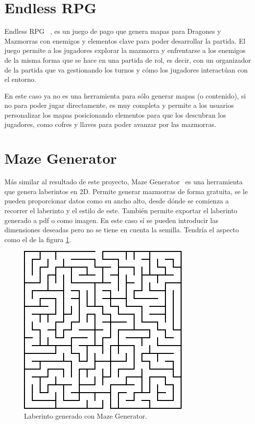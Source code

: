 \section{Endless RPG}

Endless RPG ~\cite{Endlessrpg}, es un juego de pago que genera mapas para Dragones y Mazmorras con enemigos y elementos clave para poder desarrollar la partida. El juego permite a los jugadores explorar la mazmorra y enfrentarse a los enemigos de la misma forma que se hace en una partida de rol, es decir, con un organizador de la partida que va gestionando los turnos y cómo los jugadores interactúan con el entorno. 

En este caso ya no es una herramienta para sólo generar mapas (o contenido), si no para poder jugar directamente, es muy completa y permite a los usuarios personalizar los mapas posicionando elementos para que los descubran los jugadores, como cofres y llaves para poder avanzar por las mazmorras.


\section{Maze Generator}
Más similar al resultado de este proyecto, Maze Generator~\cite{mazegenerator} es una herramienta que genera laberintos en 2D. Permite generar mazmorras de forma gratuita, se le pueden proporcionar datos como su ancho alto, desde dónde se comienza a recorrer el laberinto y el estilo de este. También permite exportar el laberinto generado a pdf o como imagen.
En este caso sí se pueden introducir las dimensiones deseadas pero no se tiene en cuenta la semilla. Tendría el aspecto como el de la figura \ref{fig:MazeGenerator}.
\begin{figure}[h]  
    \centering  
    \includegraphics[width=\textwidth]{img/MazeGeneratorExample.png}  
    \caption{Laberinto generado con Maze Generator.}  
    \label{fig:MazeGenerator}
\end{figure}


